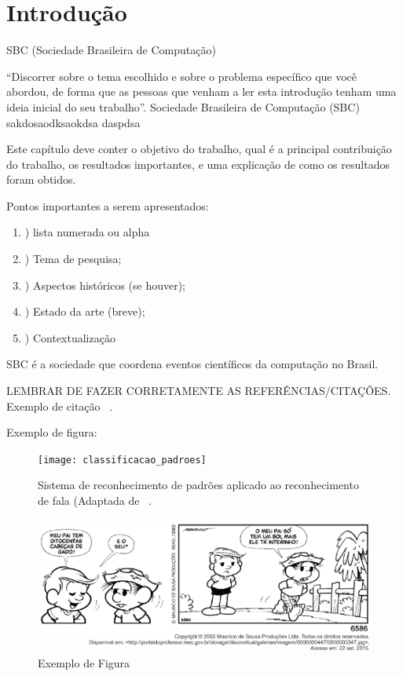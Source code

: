 \chapter{Introdução}
\label{cap:introducao}

SBC (Sociedade Brasileira de Computação)

“Discorrer sobre o tema escolhido e sobre o problema específico que você abordou, de forma que as pessoas que venham a ler esta introdução tenham uma ideia inicial do seu trabalho”. Sociedade Brasileira de Computação (SBC) sakdosaodksaokdsa daspdsa 

Este capítulo deve conter o objetivo do trabalho, qual é a principal contribuição do trabalho, os resultados importantes, e uma explicação de como os resultados foram obtidos. 

Pontos importantes a serem apresentados:
\begin{enumerate}[label={\alph*}]
    \item) lista numerada ou alpha
	\item) Tema de pesquisa;
	\item) Aspectos históricos (se houver);
	\item) Estado da arte (breve);
	\item) Contextualização
\end{enumerate}

SBC é a sociedade que coordena eventos científicos da computação no Brasil.

LEMBRAR DE FAZER CORRETAMENTE AS REFERÊNCIAS/CITAÇÕES. 
Exemplo de citação ~\cite{rabiner:1978}.

Exemplo de figura:
	
	\begin{figure}[!h]
	\centering
	\texttt{[image: classificacao\_padroes]} 
	\caption{Sistema de reconhecimento de padrões aplicado ao reconhecimento de fala (Adaptada de ~\cite{rabiner:1978}.}
	\label{fig:class_padroes} 
	\end{figure}

\begin{figure}[!htpb]
    \centering
    \includegraphics[width=1\textwidth]{minhasfigurasdotcc/metonimia.png}
    \caption{Exemplo de Figura}
    \label{fig:exemplo_de_figura}
\end{figure}


